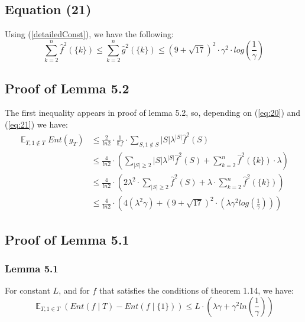\documentclass{article}
\begin{document}
		\subsection{Equation (21)}
			Using (\ref{detailedConst}), we have the following:
			\begin{equation} \label{eq:21}
				\sum_{k=2}^n \hat{f}^2 \left( \{k\} \right) 
				\leq \sum_{k=2}^n \hat{g}^2 \left( \{k\} \right) 
				\leq \left( 9 + \sqrt{17} \right) ^ 2 \cdot \gamma ^2 \cdot log \left( \frac{1}{\gamma} \right)
			\end{equation}
	
		\subsection{Proof of Lemma 5.2}
			The first inequality appears in proof of lemma 5.2, so, depending on (\ref{eq:20}) and (\ref{eq:21}) we have:
			\begin{equation} \label{lemma5:2}\begin{aligned}
				\mathop{\mathbb{E}}_{T, 1 \notin T} Ent(g_T)
				& \leq \frac{2}{ln2} \cdot \frac{1}{\mathbb{E} f} \cdot \sum_{S, 1 \notin S} |S| \lambda^{|S|} \hat{f}^2(S) \\
				& \leq \frac{4}{ln2} \cdot \left( \sum_{|S| \geq 2} |S| \lambda^{|S|} \hat{f}^2(S) + \sum_{k=2}^n \hat{f}^2 \left( \{k\} \right) \cdot \lambda \right) \\
				& \leq \frac{4}{ln2}  \cdot \left( 2 \lambda^2 \cdot \sum_{|S| \geq 2} \hat{f}^2(S) + \lambda \cdot \sum_{k=2}^n \hat{f}^2 \left( \{k\} \right) \right) \\
				& \leq \frac{4}{ln2} \cdot \left( 4 ( \lambda^2 \gamma ) + \left( 9 + \sqrt{17} \right)^2 \cdot \left( \lambda \gamma^2 log \left( \frac{1}{\gamma} \right) \right) \right)
			\end{aligned}
			\end{equation}
		
		\newpage
		\subsection{Proof of Lemma 5.1}
			\subsubsection{Lemma 5.1}
				For constant $L$, and for $f$ that satisfies the conditions of theorem 1.14, we have:
				\begin{equation} \label{Lemma5:1}
					\mathop{\mathbb{E}}_{T,1 \in T} \left( Ent \left( f \mid T \right) - Ent \left( f \mid \{1\} \right) \right) \leq L \cdot \left( \lambda \gamma + \gamma^2 ln \left( \frac{1}{\gamma} \right) \right)
				\end{equation}
			
\end{document}
